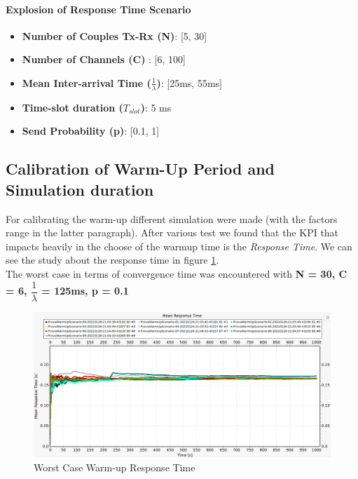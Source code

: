 \paragraph{Explosion of Response Time Scenario}
\begin{itemize}
	\item \textbf{Number of Couples Tx-Rx (N)}: [5, 30]
	\item \textbf{Number of Channels (C)} : [6, 100]
	\item \textbf{Mean Inter-arrival Time ($\frac{1}{\lambda}$)}: [25ms, 55ms] 
	\item \textbf{Time-slot duration ($T_{slot}$)}: 5 ms
	\item \textbf{Send Probability (p)}: [0.1, 1] 
\end{itemize}
\subsection{Calibration of Warm-Up Period and Simulation duration}
For calibrating the warm-up different simulation were made (with the factors range in the latter paragraph). After various test we found that the KPI that impacts heavily in the choose of the warmup time is the \textit{Response Time}. We can see the study about the response time in figure \ref{img: warmUp}.\\
The worst case in terms of convergence time was encountered with \textbf{N = 30, C = 6, $\dfrac{1}{\lambda}$ = 125ms, p = 0.1 }
\begin{figure}[H]
	\centering
	\includegraphics[width=\textwidth]{img/warmup.png}
	\caption{Worst Case Warm-up Response Time}
	\label {img: warmUp}
\end{figure}  

